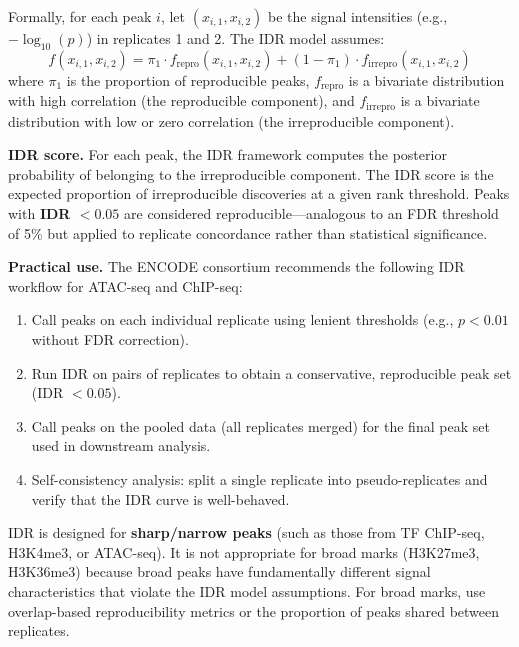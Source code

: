Formally, for each peak $i$, let $(x_{i,1}, x_{i,2})$ be the signal intensities (e.g., $-\log_{10}(p)$) in replicates 1 and 2. The IDR model assumes:
\begin{equation}
\label{eq:chromatin:idr-mixture}
f(x_{i,1}, x_{i,2}) = \pi_1 \cdot f_{\text{repro}}(x_{i,1}, x_{i,2}) + (1 - \pi_1) \cdot f_{\text{irrepro}}(x_{i,1}, x_{i,2})
\end{equation}
where $\pi_1$ is the proportion of reproducible peaks, $f_{\text{repro}}$ is a bivariate distribution with high correlation (the reproducible component), and $f_{\text{irrepro}}$ is a bivariate distribution with low or zero correlation (the irreproducible component).

\textbf{IDR score.} For each peak, the IDR framework computes the posterior probability of belonging to the irreproducible component. The IDR score is the expected proportion of irreproducible discoveries at a given rank threshold. Peaks with \textbf{IDR $< 0.05$} are considered reproducible---analogous to an FDR threshold of 5\% but applied to replicate concordance rather than statistical significance.

\textbf{Practical use.} The ENCODE consortium recommends the following IDR workflow for ATAC-seq and ChIP-seq:
\begin{enumerate}[itemsep=2pt]
  \item Call peaks on each individual replicate using lenient thresholds (e.g., $p < 0.01$ without FDR correction).
  \item Run IDR on pairs of replicates to obtain a conservative, reproducible peak set (IDR $< 0.05$).
  \item Call peaks on the pooled data (all replicates merged) for the final peak set used in downstream analysis.
  \item Self-consistency analysis: split a single replicate into pseudo-replicates and verify that the IDR curve is well-behaved.
\end{enumerate}

\begin{warningbox}
IDR is designed for \textbf{sharp/narrow peaks} (such as those from TF ChIP-seq, H3K4me3, or ATAC-seq). It is not appropriate for broad marks (H3K27me3, H3K36me3) because broad peaks have fundamentally different signal characteristics that violate the IDR model assumptions. For broad marks, use overlap-based reproducibility metrics or the proportion of peaks shared between replicates.
\end{warningbox}

